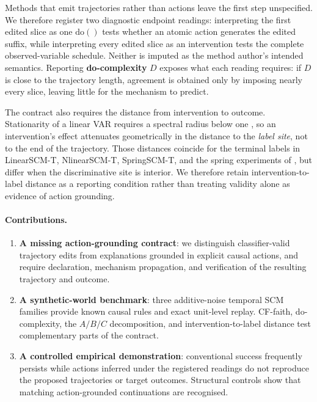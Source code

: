 \documentclass{article}
\newcommand{\dop}{\mathrm{do}}
\begin{document}
Methods that emit trajectories rather than actions leave the first step unspecified. We therefore register two diagnostic endpoint readings: interpreting the first edited slice as one $\dop()$ tests whether an atomic action generates the edited suffix, while interpreting every edited slice as an intervention tests the complete observed-variable schedule. Neither is imputed as the method author's intended semantics. Reporting \textbf{do-complexity} $D$ exposes what each reading requires: if $D$ is close to the trajectory length, agreement is obtained only by imposing nearly every slice, leaving little for the mechanism to predict.

The contract also requires the distance from intervention to outcome. Stationarity of a linear VAR requires a spectral radius below one \citep{lutkepohl2005}, so an intervention's effect attenuates geometrically in the distance to the \emph{label site}, not to the end of the trajectory. Those distances coincide for the terminal labels in LinearSCM-T, NlinearSCM-T, SpringSCM-T, and the spring experiments of \citet{bahri2025causalfeasibility}, but differ when the discriminative site is interior. We therefore retain intervention-to-label distance as a reporting condition rather than treating validity alone as evidence of action grounding.

\paragraph{Contributions.}
\begin{enumerate}
  \item \textbf{A missing action-grounding contract}: we distinguish classifier-valid trajectory edits from explanations grounded in explicit causal actions, and require declaration, mechanism propagation, and verification of the resulting trajectory and outcome.
  \item \textbf{A synthetic-world benchmark}: three additive-noise temporal SCM families provide known causal rules and exact unit-level replay. CF-faith, do-complexity, the $A/B/C$ decomposition, and intervention-to-label distance test complementary parts of the contract.
  \item \textbf{A controlled empirical demonstration}: conventional success frequently persists while actions inferred under the registered readings do not reproduce the proposed trajectories or target outcomes. Structural controls show that matching action-grounded continuations are recognised.
\end{enumerate}
\end{document}

